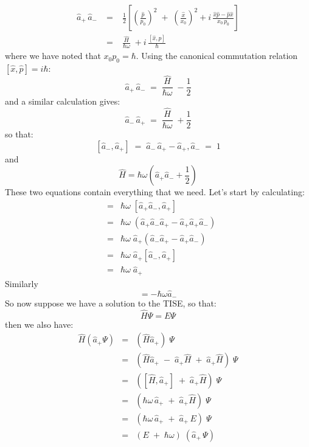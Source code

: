 \documentclass[12pt]{book}
\begin{document}
\begin{eqnarray*}
\hat{a}_{+}\, \hat{a}_{-} \; &=& \; \frac{1}{2} \left[
\left( \frac{\hat{p}}{p_0}\right)^2 \; + \; \left( \frac{\hat{x}}{x_0}\right)^2
+ i \, \frac{\hat{x}\hat{p} - \hat{p}\hat{x}}{x_0 \, p_0}
\right] \\[8pt]
&=& \; \frac{\hat{H}}{\hbar \omega} \; + i \, \frac{[\hat{x},\hat{p}]}{\hbar}
\end{eqnarray*}
where we have noted that $x_0 p_0 = \hbar$.  Using the canonical commutation relation $[\hat{x}, \hat{p}] = i\hbar$:
\begin{equation*}
\hat{a}_{+}\,\hat{a}_{-} \; = \; \frac{\hat{H}}{\hbar\omega} \; - \frac{1}{2}
\end{equation*}
and a similar calculation gives:
\begin{equation*}
\hat{a}_{-}\,\hat{a}_{+} \; = \; \frac{\hat{H}}{\hbar\omega} \; + \frac{1}{2}
\end{equation*}
so that:
\begin{equation}
\label{eqn:ladder-com}
[\hat{a}_-, \hat{a}_+] \; = \; \hat{a}_- \, \hat{a}_+ - \hat{a}_+, \hat{a}_- \; = \;  1
\end{equation}
and
\begin{equation}
\label{eqn:ladder-ham}
\hat{H} =  \hbar\omega \left( \hat{a}_+ \hat{a}_- + \frac{1}{2} \right)
\end{equation}
These two equations contain everything that we need.  Let's start by calculating:
\begin{eqnarray*}
[\hat{H}\,,\,\hat{a}_+] &=& \hbar \omega \; [\hat{a}_+ \hat{a}_-, \hat{a}_+]  \\
&=& \hbar \omega \; \left( \hat{a}_+ \hat{a}_- \hat{a}_+ - \hat{a}_+ \hat{a}_+ \hat{a}_- \right) \\
&=& \hbar \omega \; \hat{a}_+ (\hat{a}_- \hat{a}_+ - \hat{a}_+ \hat{a}_-)\\
&=& \hbar \omega \; \hat{a}_+ [\hat{a}_-, \hat{a}_+]\\
&=& \hbar \omega \; \hat{a}_+ 
\end{eqnarray*}
Similarly
\begin{equation*}
[\hat{H},\hat{a}_-] = -\hbar \omega \hat{a}_-
\end{equation*}
So now suppose we have a solution to the TISE, so that:
$$\hat{H} \Psi = E \Psi$$
then we also have:
\begin{eqnarray*}
\hat{H} \left( \hat{a}_+ \Psi \right) &=& \left( \hat{H} \hat{a}_+ \right) \; \Psi\\
     &=& \left( \hat{H} \hat{a}_+ \; - \; \hat{a}_+ \hat{H} \; + \; \hat{a}_+ \hat{H} \right) \; \Psi\\
     &=& \left( [\hat{H}, \hat{a}_+] \; + \; \hat{a}_+ \hat{H} \right) \; \Psi\\
     &=& \left( \hbar\omega \, \hat{a}_+ \; + \; \hat{a}_+ \hat{H} \right) \; \Psi\\
     &=& \left( \hbar\omega \, \hat{a}_+ \; + \; \hat{a}_+ \, E \right) \; \Psi\\
     &=& \left( E \; + \; \hbar\omega \right) \; (\hat{a}_+ \, \Psi)\\
\end{eqnarray*}
\end{document}

